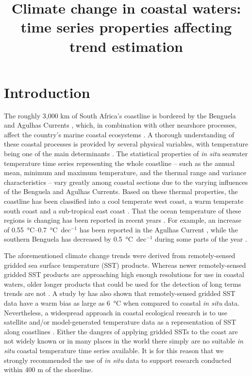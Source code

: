 \documentclass[twocol]{ametsoc}
\title{Climate change in coastal waters: time series properties affecting trend estimation}
\affiliation{Department of Biodiversity and Conservation Biology, University of the Western Cape, Robert Sobukwe Road, Bellville, 7535, Republic of South Africa}
\begin{document}
\maketitle

\section{Introduction}
The roughly 3,000 km of South Africa's coastline is bordered by the Benguela and Agulhas Currents \citep[\emph{e.g.}][]{Roberts2005,Hutchings2009}, which, in combination with other nearshore processes, affect the country's marine coastal ecosystems \citep{Santos2012a}. A thorough understanding of these coastal processes is provided by several physical variables, with temperature being one of the main determinants \citep[\emph{e.g.}][]{Blanchette2008, Tittensor2010, Couce2012}. The statistical properties of \emph{in situ} seawater temperature time series representing the whole coastline -- such as the annual mean, minimum and maximum temperature, and the thermal range and variance characteristics -- vary greatly among coastal sections due to the varying influences of the Benguela and Agulhas Currents. Based on these thermal properties, the coastline has been classified into a cool temperate west coast, a warm temperate south coast and a sub-tropical east coast \citep{Smit2013}. That the ocean temperature of these regions is changing has been reported in recent years \citep{Mead2013}. For example, an increase of \SIrange{0.55}{0.7}{\degreeCelsius}~dec$^{-1}$ has been reported in the Agulhas Current \citep{Rouault2009,Rouault2010}, while the southern Benguela has decreased by \SI{0.5}{\degreeCelsius}~dec$^{-1}$ during some parts of the year \citep{Rouault2010}.

The aforementioned climate change trends were derived from remotely-sensed gridded sea surface temperature (SST) products. Whereas newer remotely-sensed gridded SST products are approaching high enough resolutions for use in coastal waters, older longer products that could be used for the detection of long terms trends are not \citep[\emph{e.g.}][]{Chao2009, Qiu2009, Vazquez-Cuervo2013}. A study by \citet{Smit2013} has also shown that remotely-sensed gridded SST data have a warm bias as large as \SI{6}{\degreeCelsius} when compared to coastal \emph{in situ} data. Nevertheless, a widespread approach in coastal ecological research is to use satellite and/or model-generated temperature data as a representation of SST along coastlines \citep[\emph{e.g.}][]{Blanchette2008, Broitman2008a, Tyberghein2012}. Either the dangers of applying gridded SSTs to the coast are not widely known or in many places in the world there simply are no suitable \emph{in situ} coastal temperature time series available. It is for this reason that we strongly recommended the use of \emph{in situ} data to support research conducted within 400 m of the shoreline.
\end{document}
